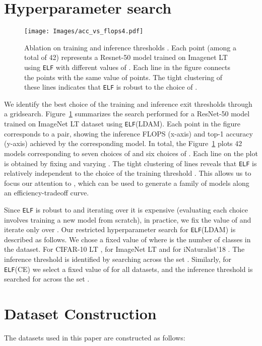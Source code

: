 \documentclass{article}
\newcommand{\method}{\texttt{ELF}\xspace}
\begin{document}
\section{Hyperparameter search}
\begin{figure}[b!]
\centering
\texttt{[image: Images/acc\_vs\_flops4.pdf]}
    \caption{Ablation on training and inference thresholds . Each point (among a total of 42) represents a Resnet-50 model trained on Imagenet LT using \method{} with different values of . 
    Each line in the figure connects the points with the same value of  points. 
    The tight clustering of these lines indicates that \method{} is robust to the choice of .
    }
  \label{fig:training_ablation}
\end{figure}

We identify the best choice of the training and inference exit thresholds  through a gridsearch. 
Figure~\ref{fig:training_ablation} summarizes the search performed for a ResNet-50 model trained on ImageNet LT dataset using \method{}{\scriptsize (LDAM)}. 
Each point in the figure corresponds to a  pair, showing the inference FLOPS (x-axis) and top-1 accuracy (y-axis) achieved by the corresponding model. 
In total, the Figure~\ref{fig:training_ablation} plots 42 models corresponding to seven choices of  and six choices of . 
Each line on the plot is obtained by fixing  and varying .
The tight clustering of lines reveals that \method{} is relatively independent to the choice of the training threshold . 
This allows us to focus our attention to , which can be used to generate a family of models along an efficiency-tradeoff curve.

Since \method{} is robust to  and iterating over it is expensive (evaluating each choice involves training a new model from scratch), in practice, we fix the value of  and iterate only over . 
Our restricted hyperparameter search for \method{}{\scriptsize (LDAM)} is described as follows. 
We chose a fixed value of  where  is the number of classes in the dataset. For CIFAR-10 LT , for ImageNet LT  and for iNaturalist'18 . 
The inference threshold  is identified by searching across the set .
Similarly, for \method{}{\scriptsize (CE)} we select a fixed value of  for all datasets, and the inference threshold  is searched for across the set .




\section{Dataset Construction}
The datasets used in this paper are constructed as follows:
\end{document}
